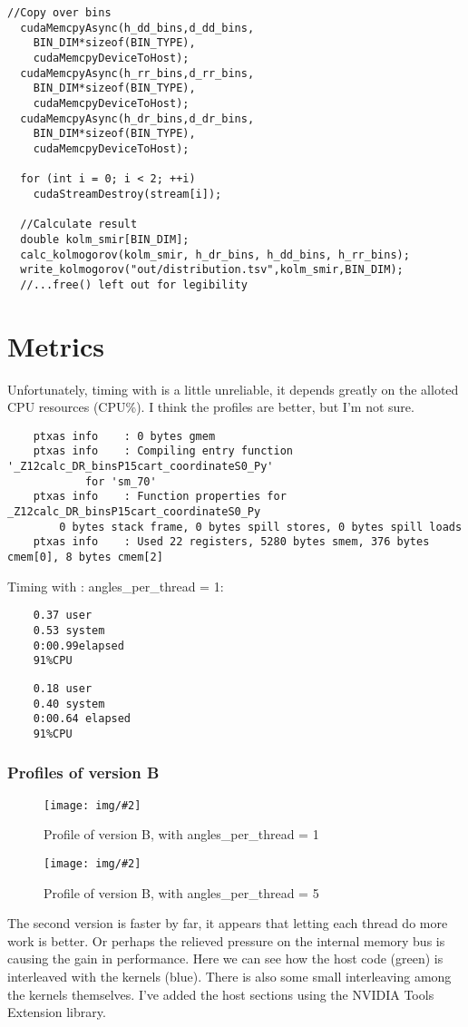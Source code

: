 \documentclass[a4paper,titlepage,12pt]{article}
\newcommand{\img}[3][0.95]{
        \begin{figure}[h]
                \centering
                \texttt{[image: img/\#2]}
                \caption{#3}
                \label{fig:#2}
        \end{figure}
}
\begin{document}
\begin{description}[left = \parindent]
\begin{lstlisting}[caption=The main function]
  //Copy over bins
  cudaMemcpyAsync(h_dd_bins,d_dd_bins,
  	BIN_DIM*sizeof(BIN_TYPE),
	cudaMemcpyDeviceToHost);
  cudaMemcpyAsync(h_rr_bins,d_rr_bins,
  	BIN_DIM*sizeof(BIN_TYPE),
	cudaMemcpyDeviceToHost);
  cudaMemcpyAsync(h_dr_bins,d_dr_bins,
  	BIN_DIM*sizeof(BIN_TYPE),
	cudaMemcpyDeviceToHost);

  for (int i = 0; i < 2; ++i)
    cudaStreamDestroy(stream[i]);

  //Calculate result
  double kolm_smir[BIN_DIM];
  calc_kolmogorov(kolm_smir, h_dr_bins, h_dd_bins, h_rr_bins);
  write_kolmogorov("out/distribution.tsv",kolm_smir,BIN_DIM);
  //...free() left out for legibility
\end{lstlisting}
\newpage

\section{Metrics}

Unfortunately, timing with  is a little unreliable, it depends greatly on the alloted CPU resources (CPU\%).
I think the profiles are better, but I'm not sure.

\begin{verbatim}
	ptxas info    : 0 bytes gmem
	ptxas info    : Compiling entry function '_Z12calc_DR_binsP15cart_coordinateS0_Py'
	        for 'sm_70'
	ptxas info    : Function properties for _Z12calc_DR_binsP15cart_coordinateS0_Py
	    0 bytes stack frame, 0 bytes spill stores, 0 bytes spill loads
	ptxas info    : Used 22 registers, 5280 bytes smem, 376 bytes cmem[0], 8 bytes cmem[2]
\end{verbatim}


Timing with :
angles\_per\_thread = 1:
\begin{verbatim} 
	0.37 user
	0.53 system
	0:00.99elapsed
	91%CPU
\end{verbatim}

\begin{verbatim}
	0.18 user
	0.40 system
	0:00.64 elapsed
	91%CPU
\end{verbatim}
\subsubsection{Profiles of version B}
\img{B1_prof}{Profile of version B, with angles\_per\_thread = 1}
\img{interleaved_synch}{Profile of version B, with angles\_per\_thread = 5}

The second version is faster by far, it appears that letting each thread do more work is better.
Or perhaps the relieved pressure on the internal memory bus is causing the gain in performance.
Here we can see how the host code (green) is interleaved with the kernels (blue).
There is also some small interleaving among the kernels themselves.
I've added the host sections using the NVIDIA Tools Extension library.


\end{description}
\end{document}

